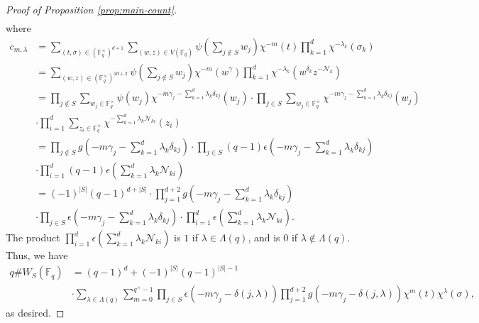 \documentclass[10pt,a4paper]{amsart}
\newcommand{\F}{\mathbb{F}}
\begin{document}
\begin{proof}[Proof of Proposition \ref{prop:main-count}]
\begin{align*}
\end{align*}
   where 
\begingroup
\allowdisplaybreaks
\begin{align*}
    c_{m,\lambda}  &= \sum_{(t,\sigma) \in \left(\F_q^\times\right)^{d+1}} \sum_{(w,z) \in V(\F_q)} \psi \left(\sum_{j\notin S} w_j\right) \chi^{-m}(t) \prod_{k=1}^d \chi^{-\lambda_k} (\sigma_k) \\
    &=  \sum_{(w,z) \in \left(\F_q^\times\right)^{2d+2} } \psi \left(\sum_{j\notin S} w_j\right) \chi^{-m}(w^\gamma) \prod_{k=1}^d \chi^{-\lambda_k}\left( w^{\delta_k}z^{-\mathcal{N}_k}\right) \\
    &=  \prod_{j \notin S}  \sum_{w_j \in \F_q^\times} \psi(w_j) \chi^{-m \gamma_j -\sum_{k=1}^d \lambda_k\delta_{kj}}(w_j) \cdot \prod_{j \in S}  \sum_{w_j \in \F_q^\times} \chi^{-m \gamma_j -\sum_{k=1}^d \lambda_k\delta_{kj}}(w_j) \\
    &\cdot  \prod_{i=1}^d \sum_{z_i \in \F_q^\times} \chi^{ - \sum_{k=1}^d \lambda_k\mathcal{N}_{ki}}(z_i) \\
    &=  \prod_{j \notin S}   g\left(-m\gamma_j -  \sum_{k=1}^d \lambda_k \delta_{kj}\right) \cdot \prod_{j\in S} (q-1)\epsilon\left( -m \gamma_j -\sum_{k=1}^d \lambda_k\delta_{kj} \right) \\
    &\cdot  \prod_{i=1}^d (q-1) \epsilon \left( \sum_{k=1}^d \lambda_k\mathcal{N}_{ki} \right) \\
    &= (-1)^{|S|} (q-1)^{d+|S|}\cdot \prod_{j=1}^{d+2} g\left(-m\gamma_j -  \sum_{k=1}^d \lambda_k \delta_{kj}\right)   \\
    &\cdot\prod_{j\in S} \epsilon\left( -m \gamma_j -\sum_{k=1}^d \lambda_k\delta_{kj} \right) \cdot \prod_{i=1}^d \epsilon \left( \sum_{k=1}^d \lambda_k\mathcal{N}_{ki} \right).
\end{align*}
\endgroup
The product $\prod_{i=1}^d \epsilon \left( \sum_{k=1}^d \lambda_k\mathcal{N}_{ki} \right)$ is $1$ if $\lambda \in \Lambda(q)$, and is $0$ if $\lambda \notin \Lambda(q)$.  Thus, we have 
\begin{align*}
    q \# W_{S} (\mathbb{F}_q) &= (q-1)^{d} + (-1)^{|S|}(q-1)^{|S|-1}\\
    &\cdot\sum_{\lambda \in \Lambda(q)}  \sum_{m=0}^{q^\times -1}\prod_{j\in S} \epsilon\left( -m \gamma_j -\delta(j,\lambda) \right)\prod_{j=1}^{d+2}g\left(-m\gamma_j - \delta(j,\lambda)\right) \chi^{m}(t) \chi^{\lambda}(\sigma),
\end{align*}
as desired.
\end{proof}
\end{document}

